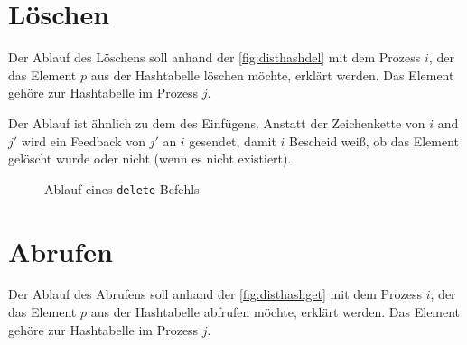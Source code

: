 \documentclass{scrreprt}
\begin{document}
\section{Löschen}
Der Ablauf des Löschens soll anhand der \autoref{fig:disthashdel} mit dem Prozess $i$, der das Element $p$ aus der Hashtabelle löschen möchte, erklärt werden. Das Element gehöre zur Hashtabelle im Prozess $j$.

Der Ablauf ist ähnlich zu dem des Einfügens. Anstatt der Zeichenkette von $i$ and $j'$ wird ein Feedback von $j'$ an $i$ gesendet, damit $i$ Bescheid weiß, ob das Element gelöscht wurde oder nicht (wenn es nicht existiert).

\begin{figure}[!ht]
\centering
{}
\caption{Ablauf eines \lstinline`delete`-Befehls}
\label{fig:disthashdel}
\end{figure}

\section{Abrufen}
Der Ablauf des Abrufens soll anhand der \autoref{fig:disthashget} mit dem Prozess $i$, der das Element $p$ aus der Hashtabelle abfrufen möchte, erklärt werden. Das Element gehöre zur Hashtabelle im Prozess $j$.
\end{document}
